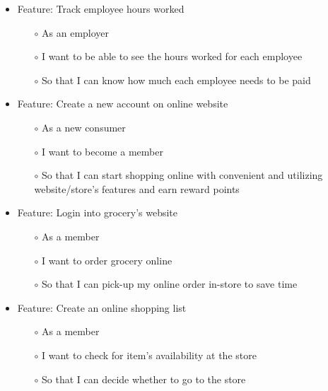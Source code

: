 \documentclass{scrreprt}
\theoremstyle{funreq}
\begin{document}
	\begin{itemize}
		\item Feature: Track employee hours worked
		\begin{itemize}
			\item[$\circ$]As an employer
			\item[$\circ$]I want to be able to see the hours worked for each employee
			\item[$\circ$]So that I can know how much each employee needs to be paid
		\end{itemize}
	\end{itemize}
	
	\begin{itemize}
		\item Feature: Create a new account on online website
		\begin{itemize}
			\item[$\circ$]As a new consumer
			\item[$\circ$]I want to become a member
			\item[$\circ$]So that I can start shopping online with convenient and utilizing website/store’s features and earn reward points
		\end{itemize}
	\end{itemize}
	
	\begin{itemize}
		\item Feature: Login into grocery’s website
		\begin{itemize}
			\item[$\circ$]As a member
			\item[$\circ$]I want to order grocery online
			\item[$\circ$]So that I can pick-up my online order in-store to save time
		\end{itemize}
	\end{itemize}
	
	\begin{itemize}
		\item Feature: Create an online shopping list
		\begin{itemize}
			\item[$\circ$]As a member
			\item[$\circ$]I want to check for item’s availability at the store
			\item[$\circ$]So that I can decide whether to go to the store
		\end{itemize}
	\end{itemize}
	
\end{document}

